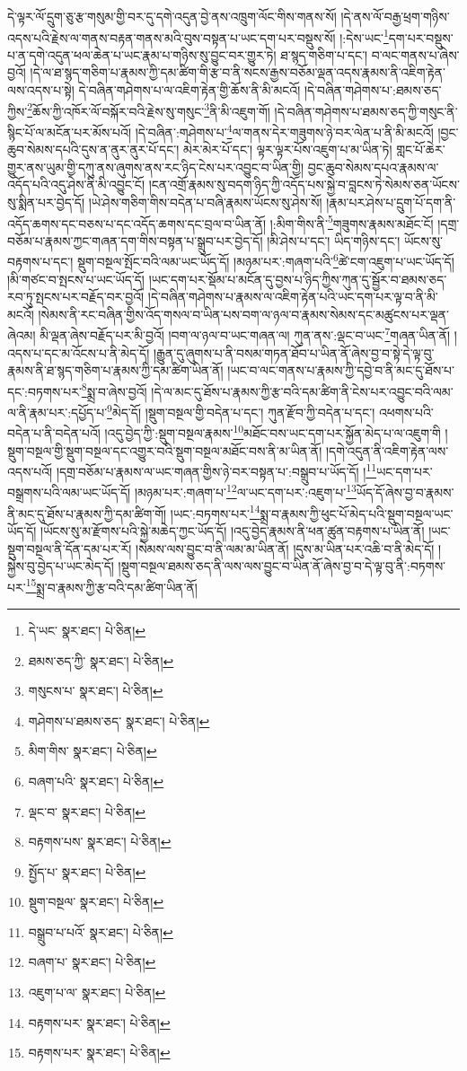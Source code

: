 དེ་ལྟར་ལོ་དྲུག་ཅུ་རྩ་གསུམ་གྱི་བར་དུ་དགེ་འདུན་བྱེ་ནས་འཁྲུག་ལོང་གིས་གནས་སོ། །དེ་ནས་ལོ་བརྒྱ་ཕྲག་གཉིས་འདས་པའི་རྗེས་ལ་གནས་བརྟན་གནས་མའི་བུས་བསྟན་པ་ཡང་དག་པར་བསྡུས་སོ། །:དེས་ཡང་\footnote{དེ་ཡང་  སྣར་ཐང་།  པེ་ཅིན། }དག་པར་བསྡུས་པ་ན་དགེ་འདུན་ཕལ་ཆེན་པ་ཡང་རྣམ་པ་གཉིས་སུ་བྱུང་བར་གྱུར་ཏེ། ཐ་སྙད་གཅིག་པ་དང་། བ་ལང་གནས་པ་ཞེས་བྱའོ། །དེ་ལ་ཐ་སྙད་གཅིག་པ་རྣམས་ཀྱི་དམ་ཚིག་གི་རྩ་བ་ནི་སངས་རྒྱས་བཅོམ་ལྡན་འདས་རྣམས་ནི་འཇིག་རྟེན་ལས་འདས་པ་སྟེ། དེ་བཞིན་གཤེགས་པ་ལ་འཇིག་རྟེན་གྱི་ཆོས་ནི་མི་མངའོ། །དེ་བཞིན་གཤེགས་པ་:ཐམས་ཅད་ཀྱིས་\footnote{ཐམས་ཅད་ཀྱི་  སྣར་ཐང་།  པེ་ཅིན། }ཆོས་ཀྱི་འཁོར་ལོ་བསྐོར་བའི་རྗེས་སུ་གསུང་\footnote{གསུངས་པ་  སྣར་ཐང་།  པེ་ཅིན། }ནི་མི་འཇུག་གོ། །དེ་བཞིན་གཤེགས་པ་ཐམས་ཅད་ཀྱི་གསུང་ནི་སྙིང་པོ་ལ་མངོན་པར་མོས་པའོ། །དེ་བཞིན་:གཤེགས་པ་\footnote{གཤེགས་པ་ཐམས་ཅད་  སྣར་ཐང་།  པེ་ཅིན། }ལ་གནས་དེར་གཟུགས་ཉེ་བར་ལེན་པ་ནི་མི་མངའོ། །བྱང་ཆུབ་སེམས་དཔའི་དུས་ན་ནུར་ནུར་པོ་དང་། མེར་མེར་པོ་དང་། ལྟར་ལྟར་པོས་འཇུག་པ་མ་ཡིན་ཏེ། གླང་པོ་ཆེར་གྱུར་ནས་ཡུམ་གྱི་དཀུ་ནས་ཞུགས་ནས་རང་ཉིད་ངེས་པར་འབྱུང་བ་ཡིན་གྱི། བྱང་ཆུབ་སེམས་དཔའ་རྣམས་ལ་འདོད་པའི་འདུ་ཤེས་ནི་མི་འབྱུང་ངོ། །ངན་འགྲོ་རྣམས་སུ་བདག་ཉིད་ཀྱི་འདོད་པས་སྐྱེ་བ་བླངས་ཏེ་སེམས་ཅན་ཡོངས་སུ་སྨིན་པར་བྱེད་དོ། །ཡེ་ཤེས་གཅིག་གིས་བདེན་པ་བཞི་རྣམས་ཡོངས་སུ་ཤེས་སོ། །རྣམ་པར་ཤེས་པ་དྲུག་པོ་དག་ནི་འདོད་ཆགས་དང་བཅས་པ་དང་འདོད་ཆགས་དང་བྲལ་བ་ཡིན་ནོ། །:མིག་གིས་ནི་\footnote{མིག་གིས་  སྣར་ཐང་།  པེ་ཅིན། }གཟུགས་རྣམས་མཐོང་ངོ། །དགྲ་བཅོམ་པ་རྣམས་ཀྱང་གཞན་དག་གིས་བསྟན་པ་སྒྲུབ་པར་བྱེད་དོ། །མི་ཤེས་པ་དང་། ཡིད་གཉིས་དང་། ཡོངས་སུ་བརྟགས་པ་དང་། སྡུག་བསྔལ་སྤོང་བའི་ལམ་ཡང་ཡོད་དོ། །མཉམ་པར་:གཞག་པའི་\footnote{བཞག་པའི་  སྣར་ཐང་།  པེ་ཅིན། }ཚེ་ངག་འཇུག་པ་ཡང་ཡོད་དོ། །མི་གཙང་བ་སྤངས་པ་ཡང་ཡོད་དོ། །ཡང་དག་པར་སྡོམ་པ་མངོན་དུ་བྱས་པ་ཉིད་ཀྱིས་ཀུན་དུ་སྦྱོར་བ་ཐམས་ཅད་རབ་ཏུ་སྤངས་པར་བརྗོད་བར་བྱའོ། །དེ་བཞིན་གཤེགས་པ་རྣམས་ལ་འཇིག་རྟེན་པའི་ཡང་དག་པར་ལྟ་བ་ནི་མི་མངའོ། །སེམས་ནི་རང་བཞིན་གྱིས་འོད་གསལ་བ་ཡིན་པས་བག་ལ་ཉལ་བ་རྣམས་སེམས་དང་མཚུངས་པར་ལྡན་ཞེའམ། མི་ལྡན་ཞེས་བརྗོད་པར་མི་བྱའོ། །བག་ལ་ཉལ་བ་ཡང་གཞན་ལ། ཀུན་ནས་:ལྡང་བ་ཡང་\footnote{ལྡང་བ་  སྣར་ཐང་།  པེ་ཅིན། }གཞན་ཡིན་ནོ། །འདས་པ་དང་མ་འོངས་པ་ནི་མེད་དོ། །རྒྱུན་དུ་ཞུགས་པ་ནི་བསམ་གཏན་ཐོབ་པ་ཡིན་ནོ་ཞེས་བྱ་བ་སྟེ་དེ་ལྟ་བུ་རྣམས་ནི་ཐ་སྙད་གཅིག་པ་རྣམས་ཀྱི་དམ་ཚིག་ཡིན་ནོ། །ཡང་བ་ལང་གནས་པ་རྣམས་ཀྱི་དབྱེ་བ་ནི་མང་དུ་ཐོས་པ་དང་:བཏགས་པར་\footnote{བརྟགས་པས་  སྣར་ཐང་།  པེ་ཅིན། }སྨྲ་བ་ཞེས་བྱའོ། །དེ་ལ་མང་དུ་ཐོས་པ་རྣམས་ཀྱི་རྩ་བའི་དམ་ཚིག་ནི་ངེས་པར་འབྱུང་བའི་ལམ་ལ་ནི་རྣམ་པར་:དཔྱོད་པ་\footnote{སྤྱོད་པ་  སྣར་ཐང་།  པེ་ཅིན། }མེད་དོ། །སྡུག་བསྔལ་གྱི་བདེན་པ་དང་། ཀུན་རྫོབ་ཀྱི་བདེན་པ་དང་། འཕགས་པའི་བདེན་པ་ནི་བདེན་པའོ། །འདུ་བྱེད་ཀྱི་:སྡུག་བསྔལ་རྣམས་\footnote{སྡུག་བསྔལ་  སྣར་ཐང་།  པེ་ཅིན། }མཐོང་བས་ཡང་དག་པར་སྐྱོན་མེད་པ་ལ་འཇུག་གི །སྡུག་བསྔལ་གྱི་སྡུག་བསྔལ་དང་འགྱུར་བའི་སྡུག་བསྔལ་མཐོང་བས་ནི་མ་ཡིན་ནོ། །དགེ་འདུན་ནི་འཇིག་རྟེན་ལས་འདས་པའོ། །དགྲ་བཅོམ་པ་རྣམས་ལ་ཡང་གཞན་གྱིས་ཉེ་བར་བསྟན་པ་:བསྒྲུབ་པ་ཡོད་དོ། །\footnote{བསྒྲུབ་པ་པའོ་  སྣར་ཐང་།  པེ་ཅིན། }ཡང་དག་པར་བསྒྲགས་པའི་ལམ་ཡང་ཡོད་དོ། །མཉམ་པར་:གཞག་པ་\footnote{བཞག་པ་  སྣར་ཐང་།  པེ་ཅིན། }ལ་ཡང་དག་པར་:འཇུག་པ་\footnote{འཇུག་པ་ལ་  སྣར་ཐང་།  པེ་ཅིན། }ཡོད་དོ་ཞེས་བྱ་བ་རྣམས་ནི་མང་དུ་ཐོས་པ་རྣམས་ཀྱི་དམ་ཚིག་གོ། །ཡང་:བཏགས་པར་\footnote{བརྟགས་པར་  སྣར་ཐང་།  པེ་ཅིན། }སྨྲ་བ་རྣམས་ཀྱི་ཕུང་པོ་མེད་པའི་སྡུག་བསྔལ་ཡང་ཡོད་དོ། །ཡོངས་སུ་མ་རྫོགས་པའི་སྐྱེ་མཆེད་ཀྱང་ཡོད་དོ། །འདུ་བྱེད་རྣམས་ནི་ཕན་ཚུན་བརྟགས་པ་ཡིན་ནོ། །ཡང་སྡུག་བསྔལ་ནི་དོན་དམ་པར་རོ། །སེམས་ལས་བྱུང་བ་ནི་ལམ་མ་ཡིན་ནོ། །དུས་མ་ཡིན་པར་འཆི་བ་ནི་མེད་དོ། །སྐྱེས་བུ་བྱེད་པ་ཡང་མེད་དོ། །སྡུག་བསྔལ་ཐམས་ཅད་ནི་ལས་ལས་བྱུང་བ་ཡིན་ནོ་ཞེས་བྱ་བ་དེ་ལྟ་བུ་ནི་:བཏགས་པར་\footnote{བརྟགས་པར་  སྣར་ཐང་།  པེ་ཅིན། }སྨྲ་བ་རྣམས་ཀྱི་རྩ་བའི་དམ་ཚིག་ཡིན་ནོ། 